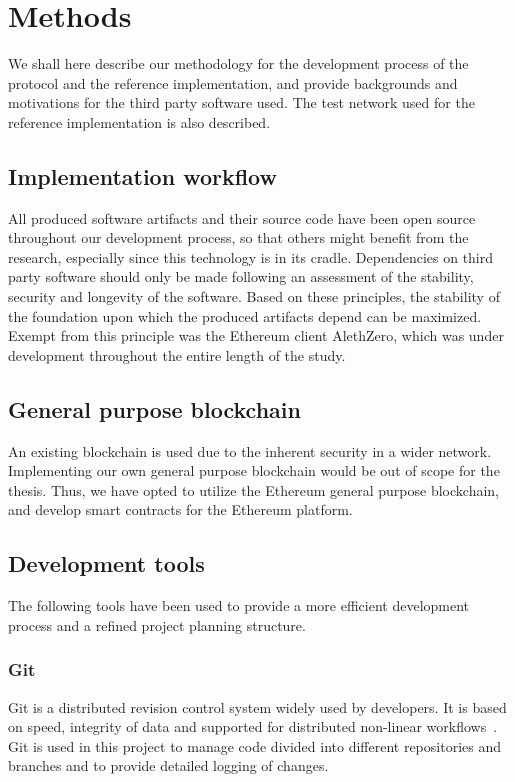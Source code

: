 \chapter{Methods}
We shall here describe our methodology for the development process of the protocol and the reference implementation, and provide backgrounds and motivations for the third party software used. The test network used for the reference implementation is also described.

\section{Implementation workflow}
All produced software artifacts and their source code have been open source throughout our development process, so that others might benefit from the research, especially since this technology is in its cradle. Dependencies on third party software should only be made following an assessment of the stability, security and longevity of the software. Based on these principles, the stability of the foundation upon which the produced artifacts depend can be maximized. Exempt from this principle was the Ethereum client AlethZero, which was under development throughout the entire length of the study. 

\section{General purpose blockchain}
An existing blockchain is used due to the inherent security in a wider network. Implementing our own general purpose blockchain would be out of scope for the thesis. Thus, we have opted to utilize the Ethereum general purpose blockchain, and develop smart contracts for the Ethereum platform.

\section{Development tools}
The following tools have been used to provide a more efficient development process and a refined project planning structure.

\subsection{Git}
Git is a distributed revision control system widely used by developers. It is based on speed, integrity of data and supported for distributed non-linear workflows~\cite{git}. Git is used in this project to manage code divided into different repositories and branches and to provide detailed logging of changes. 

